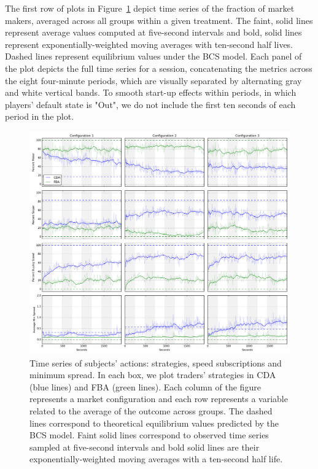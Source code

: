 \documentclass[12pt]{article}
\begin{document}
The first row of plots in Figure~\ref{fig:allPlots} depict time series of the fraction of market makers, averaged across all groups within a given treatment. The faint, solid lines represent average values computed at five-second intervals and bold, solid lines represent exponentially-weighted moving averages with ten-second half lives. 
Dashed lines represent equilibrium values under the BCS model. Each panel of the plot depicts the full time series for a session, concatenating the metrics across the eight four-minute periods, which are visually separated by alternating gray and white vertical bands. To smooth start-up effects within periods, in which players' default state is "Out", we do not include the first ten seconds of each period in the plot.
\begin{figure}
\centering
\includegraphics[width=1\textwidth]{img/allPlots.png}
\caption{Time series of subjects' actions: strategies, speed subscriptions and minimum spread. {\small In each box, we plot traders' strategies in CDA (blue lines) and FBA (green lines). Each column of the figure represents a market configuration and each row represents a variable related to the average of the outcome across groups. 
The dashed lines correspond to theoretical equilibrium values predicted by the BCS model. Faint solid lines correspond to observed time series sampled at five-second intervals and bold solid lines are their exponentially-weighted moving averages with a ten-second half life.} \label{fig:allPlots} } 
\end{figure}
\end{document}
